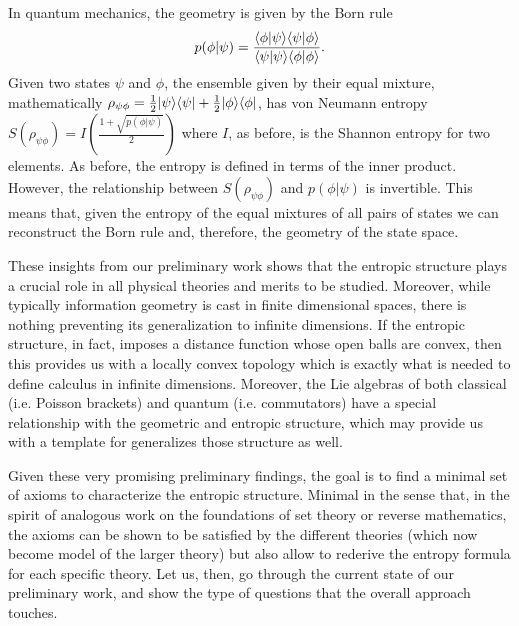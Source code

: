 In quantum mechanics, the geometry is given by the Born rule
\begin{equation}
	p(\phi|\psi) = \frac{\langle \phi | \psi \rangle\langle \psi | \phi \rangle}{\langle \psi | \psi \rangle\langle \phi | \phi \rangle}.
\end{equation}
Given two states $\psi$ and $\phi$, the ensemble given by their equal mixture, mathematically $\rho_{\psi\phi} = \frac{1}{2}|\psi\rangle\langle\psi|+\frac{1}{2}|\phi\rangle\langle\phi|$,  has von Neumann entropy $S(\rho_{\psi\phi}) = I\left(\frac{1 + \sqrt{p(\phi|\psi)}}{2} \right)$ where $I$, as before, is the Shannon entropy for two elements. As before, the entropy is defined in terms of the inner product. However, the relationship between $S(\rho_{\psi\phi})$ and $p(\phi|\psi)$ is invertible. This means that, given the entropy of the equal mixtures of all pairs of states we can reconstruct the Born rule and, therefore, the geometry of the state space.

These insights from our preliminary work shows that the entropic structure plays a crucial role in all physical theories and merits to be studied. Moreover, while typically information geometry is cast in finite dimensional spaces, there is nothing preventing its generalization to infinite dimensions. If the entropic structure, in fact, imposes a distance function whose open balls are convex, then this provides us with a locally convex topology which is exactly what is needed to define calculus in infinite dimensions. Moreover, the Lie algebras of both classical (i.e. Poisson brackets) and quantum (i.e. commutators) have a special relationship with the geometric and entropic structure, which may provide us with a template for generalizes those structure as well. 

Given these very promising preliminary findings, the goal is to find a minimal set of axioms to characterize the entropic structure. Minimal in the sense that, in the spirit of analogous work on the foundations of set theory or reverse mathematics, the axioms can be shown to be satisfied by the different theories (which now become model of the larger theory) but also allow to rederive the entropy formula for each specific theory. Let us, then, go through the current state of our preliminary work, and show the type of questions that the overall approach touches.



